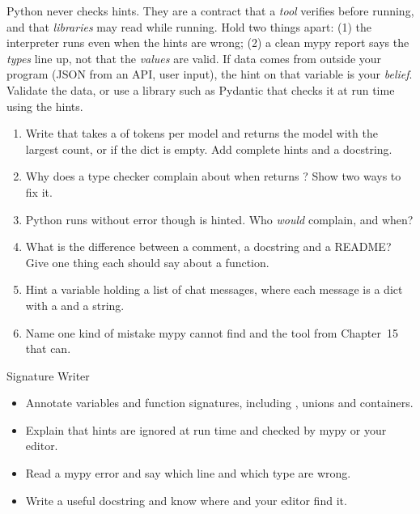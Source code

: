 \begin{boss}
Python never checks hints. They are a contract that a \emph{tool} verifies before running, and that
\emph{libraries} may read while running. Hold two things apart: (1) the interpreter runs even when the hints are wrong;
(2) a clean mypy report says the \emph{types} line up, not that the \emph{values} are valid. If data comes from
outside your program (JSON from an API, user input), the hint on that variable is your \emph{belief}. Validate the
data, or use a library such as Pydantic that checks it at run time using the hints.
\end{boss}

\begin{practice}
\begin{enumerate}[leftmargin=*,itemsep=2pt]
\item Write  that takes a  of tokens per model and returns the model with the largest count, or  if the dict is empty. Add complete hints and a docstring.
\item Why does a type checker complain about  when  returns ? Show two ways to fix it.
\item Python runs  without error though  is hinted. Who \emph{would} complain, and when?
\item What is the difference between a comment, a docstring and a README? Give one thing each should say about a  function.
\item Hint a variable holding a list of chat messages, where each message is a dict with a  and a  string.
\item Name one kind of mistake mypy cannot find and the tool from Chapter~15 that can.
\end{enumerate}
\end{practice}

\begin{achievement}{Signature Writer}
\begin{itemize}[leftmargin=*,itemsep=1pt]
\item Annotate variables and function signatures, including , unions and containers.
\item Explain that hints are ignored at run time and checked by mypy or your editor.
\item Read a mypy error and say which line and which type are wrong.
\item Write a useful docstring and know where  and your editor find it.
\end{itemize}
\end{achievement}

